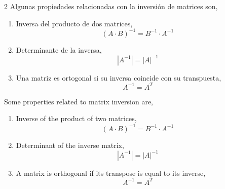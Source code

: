 \begin{paracol}{2}
Algunas propiedades relacionadas con la inversión de matrices son,
\begin{enumerate}
\item Inversa del producto de dos matrices,
\begin{equation*}
(A\cdot B)^{-1}=B^{-1}\cdot A^{-1}
\end{equation*}

\item Determinante de la inversa,
\begin{equation*}
\left\vert A^{-1} \right\vert = \vert A \vert ^{-1}
\end{equation*}

\item Una matriz es ortogonal si su inversa coincide con su transpuesta,
\begin{equation*}
A^{-1}=A^T
\end{equation*}
\end{enumerate}
\switchcolumn
Some properties related to matrix inversion are,
\begin{enumerate}
	\item Inverse of the product of two matrices,
	\begin{equation*}
		(A\cdot B)^{-1}=B^{-1}\cdot A^{-1}
	\end{equation*}
	
	\item Determinant of the inverse matrix,
	\begin{equation*}
		\left\vert A^{-1} \right\vert = \vert A \vert ^{-1}
	\end{equation*}
	
	\item A matrix is orthogonal if its transpose is equal to its inverse,
	\begin{equation*}
		A^{-1}=A^T
	\end{equation*}
\end{enumerate}
\end{paracol}

